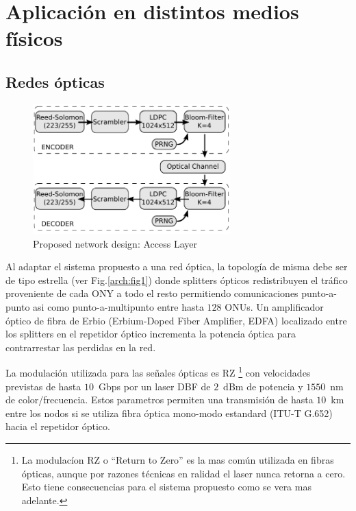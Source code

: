 \section{Aplicación en distintos medios físicos}
\subsection{Redes ópticas}
\begin{figure}[!t]
  \centering
    \includegraphics[width=3in]{orte01.pdf}
    \caption{Proposed network design: Access Layer}
    \label{arch:chain}
\end{figure}

Al adaptar el sistema propuesto a una red óptica, la topología de misma debe ser de tipo estrella (ver Fig.\ref{arch:fig1}) donde splitters ópticos redistribuyen el tráfico proveniente de cada ONY a todo el resto permitiendo comunicaciones punto-a-punto asi como punto-a-multipunto entre hasta $128$ ONUs.
Un amplificador óptico de fibra de Erbio (Erbium-Doped Fiber Amplifier, EDFA) localizado entre los splitters en el repetidor óptico incrementa la potencia óptica para contrarrestar las perdidas en la red. 

La modulación utilizada para las señales ópticas es RZ \footnote{La modulacíon RZ o ``Return to Zero'' es la mas común utilizada en fibras ópticas, aunque por razones técnicas en ralidad el laser nunca retorna a cero. Esto tiene consecuencias para el sistema propuesto como se vera mas adelante.} con velocidades previstas de hasta $10$~Gbps por un laser DBF de $2$~dBm de potencia y $1550$~nm de color/frecuencia. Estos parametros permiten una transmisión de hasta $10$~km entre los nodos si se utiliza fibra óptica mono-modo estandard (ITU-T G.652) hacia el repetidor óptico.

